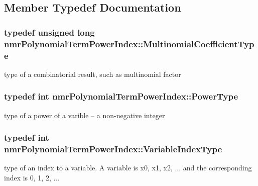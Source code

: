 \subsection{Member Typedef Documentation}
\hypertarget{classnmr_polynomial_term_power_index_a09f482da776cfb829e26ad1fb381ab94}{
\subsubsection[{Multinomial\-Coefficient\-Type}]{\setlength{\rightskip}{0pt plus 5cm}typedef unsigned long {\bf nmr\-Polynomial\-Term\-Power\-Index\-::\-Multinomial\-Coefficient\-Type}}}\label{classnmr_polynomial_term_power_index_a09f482da776cfb829e26ad1fb381ab94}
type of a combinatorial result, such as multinomial factor \hypertarget{classnmr_polynomial_term_power_index_a2eec01c3a2c3f56f47982ceffd8e36ed}{
\subsubsection[{Power\-Type}]{\setlength{\rightskip}{0pt plus 5cm}typedef int {\bf nmr\-Polynomial\-Term\-Power\-Index\-::\-Power\-Type}}}\label{classnmr_polynomial_term_power_index_a2eec01c3a2c3f56f47982ceffd8e36ed}
type of a power of a varible -- a non-\/negative integer \hypertarget{classnmr_polynomial_term_power_index_ac982d5f82c3a95968e92d54c92cbc3e0}{
\subsubsection[{Variable\-Index\-Type}]{\setlength{\rightskip}{0pt plus 5cm}typedef int {\bf nmr\-Polynomial\-Term\-Power\-Index\-::\-Variable\-Index\-Type}}}\label{classnmr_polynomial_term_power_index_ac982d5f82c3a95968e92d54c92cbc3e0}
type of an index to a variable. A variable is x0, x1, x2, ... and the corresponding index is 0, 1, 2, ... 


